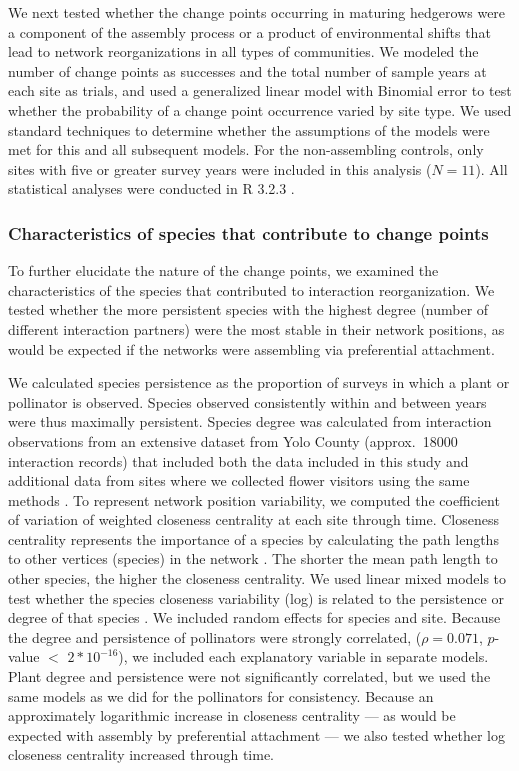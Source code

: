 \documentclass[12pt]{article}
\begin{document}
We next tested whether the change points occurring in maturing
hedgerows were a component of the assembly process or a product of
environmental shifts that lead to network reorganizations in all types
of communities. We modeled the number of change points as successes
and the total number of sample years at each site as trials, and used
a generalized linear model with Binomial error to test whether the
probability of a change point occurrence varied by site type. We used
standard techniques to determine whether the assumptions of the models
were met for this and all subsequent models. For the non-assembling
controls, only sites with five or greater survey years were included
in this analysis ($N=11$). All statistical analyses were conducted in
R 3.2.3 \citep{R}.

\subsubsection*{Characteristics of species that contribute to change
  points}

To further elucidate the nature of the change points, we examined the
characteristics of the species that contributed to interaction
reorganization. We tested whether the more persistent species with the
highest degree (number of different interaction partners) were the
most stable in their network positions, as would be expected if the
networks were assembling via preferential attachment.

We calculated species persistence as the proportion of surveys in
which a plant or pollinator is observed. Species observed consistently
within and between years were thus maximally persistent. Species
degree was calculated from interaction observations from an extensive
dataset from Yolo County (approx.~18000 interaction records) that
included both the data included in this study and additional data from
sites where we collected flower visitors using the same methods
\citep{mgonigle-2015-x, ponisio2015farm}. To represent network
position variability, we computed the coefficient of variation of
weighted closeness centrality \citep{freeman1978centrality} at each
site through time. Closeness centrality represents the importance of a
species by calculating the path lengths to other vertices (species) in
the network \citep{freeman1978centrality}. The shorter the mean path
length to other species, the higher the closeness centrality. We used
linear mixed models to test whether the species closeness variability
(log) is related to the persistence or degree of that species
\citep{lme4, lmetest}. We included random effects for species and
site. Because the degree and persistence of pollinators were strongly
correlated, ($\rho = 0.071$, $p$-value $<$ $2*10^{-16}$), we included
each explanatory variable in separate models. Plant degree and
persistence were not significantly correlated, but we used the same
models as we did for the pollinators for consistency.  Because an
approximately logarithmic increase in closeness centrality --- as
would be expected with assembly by preferential attachment --- we also
tested whether log closeness centrality increased through time.
\end{document}
